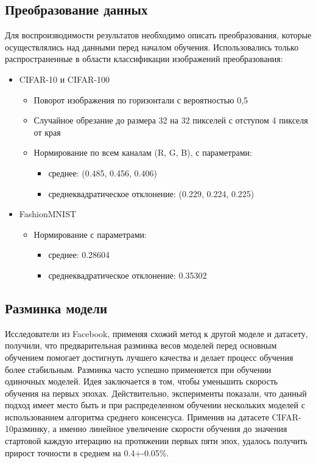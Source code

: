 \documentclass[a4paper,article,14pt]{extarticle}
\begin{document}
\subsection{Преобразование данных}
Для воспроизводимости результатов необходимо описать преобразования, которые осуществлялись над данными перед началом обучения.
Использовались только распространенные в области классификации изображений преобразования:
\begin{itemize}
    \item CIFAR-10 и CIFAR-100
    \begin{itemize}
    \item Поворот изображения по горизонтали с вероятностью 0,5
    \item Случайное обрезание до размера 32 на 32 пикселей с отступом 4 пикселя от края
    \item Нормирование по всем каналам (R, G, B), с параметрами:
        \begin{itemize}
            \item среднее: (0.485, 0.456, 0.406)
            \item среднеквадратическое отклонение: (0.229, 0.224, 0.225)
        \end{itemize}
    \end{itemize}

    \item FashionMNIST
    \begin{itemize}
    \item Нормирование с параметрами:
        \begin{itemize}
            \item среднее: 0.28604
            \item среднеквадратическое отклонение: 0.35302
        \end{itemize}
    \end{itemize}

\end{itemize}

\subsection{Разминка модели}
Исследователи из Facebook, применяя \cite{012} схожий метод к другой моделе и датасету, получили, что предварительная разминка весов моделей перед основным обучением помогает достигнуть лучшего качества и делает процесс обучения более стабильным. Разминка часто успешно применяется при обучении одиночных моделей. Идея заключается в том, чтобы уменьшить скорость обучения на первых эпохах. Действительно, эксперименты показали, что данный подход имеет место быть и при распределенном обучении нескольких моделей с использованием алгоритма среднего консенсуса. Применив на датасете \flqq CIFAR-10\frqq{} разминку, а именно линейное увеличение скорости обучения до значения стартовой каждую итерацию на протяжении первых пяти эпох, удалось получить прирост точности в среднем на 0.4+-0.05\%.
\end{document}
